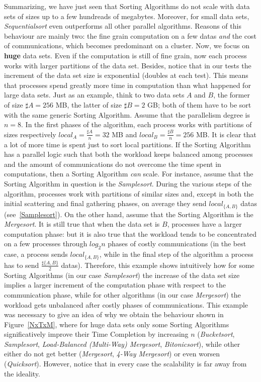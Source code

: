 Summarizing, we have just seen that Sorting Algorithms do not scale with data sets of sizes up to a few hundreads of megabytes. Moreover, for small data sets, \textit{Sequentialsort} even outperforms all other parallel algorithms. Reasons of this behaviour are mainly two: the fine grain computation on a few datas \textit{and} the cost of communications, which becomes predominant on a cluster. Now, we focus on \textbf{huge} data sets. Even if the computation is still of fine grain, now each process works with larger partitions of the data set. Besides, notice that in our tests the increment of the data set size is exponential (doubles at each test). This means that processes spend greatly more time in computation than what happened for large data sets. Just as an example, think to two data sets $A$ and $B$, the former of size $\sharp A = 256$ MB, the latter of size $\sharp B = 2$ GB; both of them have to be sort with the same generic Sorting Algorithm. Assume that the parallelism degree is $n=8$. In the first phases of the algorithm, each process works with partitions of sizes respectively $local_A = \frac{\sharp A}{n} = 32$ MB and $local_B = \frac{\sharp B}{n} = 256$ MB. It is clear that a lot of more time is spent just to sort local partitions. If the Sorting Algorithm has a parallel logic such that both the workload keeps balanced among processes and the amount of communications do not overcome the time spent in computations, then a Sorting Algorithm \textit{can} scale. For instance, assume that the Sorting Algorithm in question is the \textit{Samplesort}. During the various steps of the algorithm, processes work with partitions of similar sizes and, except in both the initial scattering and final gathering phases, on average they send $local_{\lbrace A,B \rbrace}$ datas (see~\ref{Samplesort}). On the other hand, assume that the Sorting Algorithm is the \textit{Mergesort}. It is still true that when the data set is $B$, processes have a larger computation phase: but it is also true that the workload tends to be concentrated on a few processes through $log_2{n}$ phases of costly communications (in the best case, a process sends $local_{\lbrace A,B \rbrace}$, while in the final step of the algorithm a process has to send $\frac{\sharp\lbrace A,B\rbrace}{2}$ datas). Therefore, this example shows intuitively how for some Sorting Algorithms (in our case \textit{Samplesort}) the increase of the data set size implies a larger increment of the computation phase with respect to the communication phase, while for other algorithms (in our case \textit{Mergesort}) the workload gets unbalanced after costly phases of communications. This example was necessary to give an idea of why we obtain the behaviour shown in Figure~\ref{NxTxM}, where for huge data sets only some Sorting Algorithms significatively improve their Time Completion by increasing $n$ (\textit{Bucketsort}, \textit{Samplesort}, \textit{Load-Balanced (Multi-Way) Mergesort}, \textit{Bitonicsort}), while other either do not get better (\textit{Mergesort}, \textit{4-Way Mergesort}) or even worsen (\textit{Quicksort}). However, notice that in every case the scalability is far away from the ideality.


